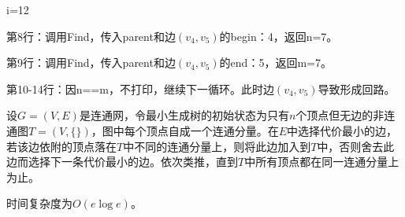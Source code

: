\begin{frame}[fragile]\ft{\subsubsecname}
\tf i=12
\vspace{0.05in}

第8行：调用Find，传入parent和边$(v_4,v_5)$的begin：4，返回n=7。 \vspace{0.05in}

第9行：调用Find，传入parent和边$(v_4,v_5)$的end：5，返回m=7。 \vspace{0.05in}

第10-14行：因n==m，不打印，继续下一循环。此时边$(v_4,v_5)$导致形成回路。
\end{frame}


\begin{frame}\ft{\subsubsecname}
设$G=(V,E)$是连通网，令最小生成树的初始状态为只有$n$个顶点但无边的非连通图$T=(V,\{\})$，图中每个顶点自成一个连通分量。在$E$中选择代价最小的边，若该边依附的顶点落在$T$中不同的连通分量上，则将此边加入到$T$中，否则舍去此边而选择下一条代价最小的边。依次类推，直到$T$中所有顶点都在同一连通分量上为止。
\vspace{0.1in}

时间复杂度为$O(e\log e)$。

\end{frame}








